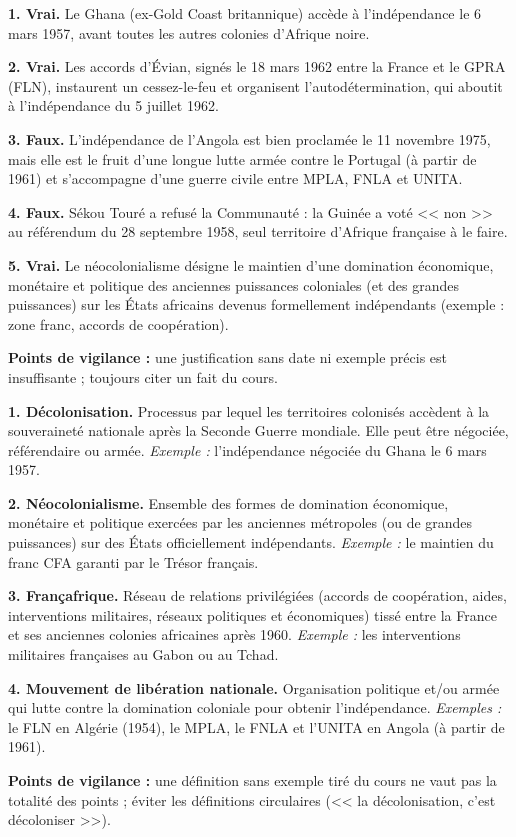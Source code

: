 \documentclass[11pt]{article}
\begin{document}
\begin{corrige}
\textbf{1. Vrai.} Le Ghana (ex-Gold Coast britannique) accède à l'indépendance le 6 mars 1957, avant toutes les autres colonies d'Afrique noire.

\textbf{2. Vrai.} Les accords d'Évian, signés le 18 mars 1962 entre la France et le GPRA (FLN), instaurent un cessez-le-feu et organisent l'autodétermination, qui aboutit à l'indépendance du 5 juillet 1962.

\textbf{3. Faux.} L'indépendance de l'Angola est bien proclamée le 11 novembre 1975, mais elle est le fruit d'une longue lutte armée contre le Portugal (à partir de 1961) et s'accompagne d'une guerre civile entre MPLA, FNLA et UNITA.

\textbf{4. Faux.} Sékou Touré a refusé la Communauté : la Guinée a voté << non >> au référendum du 28 septembre 1958, seul territoire d'Afrique française à le faire.

\textbf{5. Vrai.} Le néocolonialisme désigne le maintien d'une domination économique, monétaire et politique des anciennes puissances coloniales (et des grandes puissances) sur les États africains devenus formellement indépendants (exemple : zone franc, accords de coopération).

\textbf{Points de vigilance :} une justification sans date ni exemple précis est insuffisante ; toujours citer un fait du cours.
\end{corrige}

\begin{corrige}
\textbf{1. Décolonisation.} Processus par lequel les territoires colonisés accèdent à la souveraineté nationale après la Seconde Guerre mondiale. Elle peut être négociée, référendaire ou armée. \emph{Exemple :} l'indépendance négociée du Ghana le 6 mars 1957.

\textbf{2. Néocolonialisme.} Ensemble des formes de domination économique, monétaire et politique exercées par les anciennes métropoles (ou de grandes puissances) sur des États officiellement indépendants. \emph{Exemple :} le maintien du franc CFA garanti par le Trésor français.

\textbf{3. Françafrique.} Réseau de relations privilégiées (accords de coopération, aides, interventions militaires, réseaux politiques et économiques) tissé entre la France et ses anciennes colonies africaines après 1960. \emph{Exemple :} les interventions militaires françaises au Gabon ou au Tchad.

\textbf{4. Mouvement de libération nationale.} Organisation politique et/ou armée qui lutte contre la domination coloniale pour obtenir l'indépendance. \emph{Exemples :} le FLN en Algérie (1954), le MPLA, le FNLA et l'UNITA en Angola (à partir de 1961).

\textbf{Points de vigilance :} une définition sans exemple tiré du cours ne vaut pas la totalité des points ; éviter les définitions circulaires (<< la décolonisation, c'est décoloniser >>).
\end{corrige}
\end{document}
